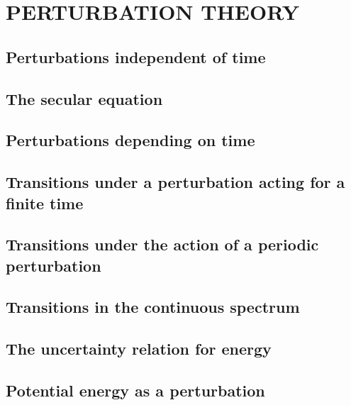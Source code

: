 \chapter{PERTURBATION THEORY}\label{PERTURBATION THEORY}
\section{Perturbations independent of time}\label{Perturbations independent of time}
\section{The secular equation}\label{The secular equation}
\section{Perturbations depending on time}\label{Perturbations depending on time}
\section{Transitions under a perturbation acting for a finite time}\label{Transitions under a perturbation acting for a finite time}
\section{Transitions under the action of a periodic perturbation}\label{Transitions under the action of a periodic perturbation}
\section{Transitions in the continuous spectrum}\label{Transitions in the continuous spectrum}
\section{The uncertainty relation for energy}\label{The uncertainty relation for energy}
\section{Potential energy as a perturbation}\label{Potential energy as a perturbation}